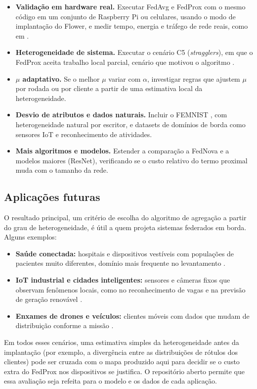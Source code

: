 \begin{itemize}[leftmargin=*, itemsep=2pt]
    \item \textbf{Validação em hardware real.} Executar FedAvg e FedProx com o mesmo código em um conjunto de Raspberry Pi ou celulares, usando o modo de implantação do Flower, e medir tempo, energia e tráfego de rede reais, como em \citet{carranco2025adhoc}.
    \item \textbf{Heterogeneidade de sistema.} Executar o cenário C5 (\textit{stragglers}), em que o FedProx aceita trabalho local parcial, cenário que motivou o algoritmo \citep{li2020fedprox}.
    \item \textbf{$\mu$ adaptativo.} Se o melhor $\mu$ variar com $\alpha$, investigar regras que ajustem $\mu$ por rodada ou por cliente a partir de uma estimativa local da heterogeneidade.
    \item \textbf{Desvio de atributos e dados naturais.} Incluir o FEMNIST \citep{caldas2018leaf}, com heterogeneidade natural por escritor, e datasets de domínios de borda como sensores IoT e reconhecimento de atividades.
    \item \textbf{Mais algoritmos e modelos.} Estender a comparação a FedNova \citep{wang2020fednova} e a modelos maiores (ResNet), verificando se o custo relativo do termo proximal muda com o tamanho da rede.
\end{itemize}

\subsection{Aplicações futuras}

O resultado principal, um critério de escolha do algoritmo de agregação a partir do grau de heterogeneidade, é útil a quem projeta sistemas federados em borda. Alguns exemplos:

\begin{itemize}[leftmargin=*, itemsep=2pt]
    \item \textbf{Saúde conectada:} hospitais e dispositivos vestíveis com populações de pacientes muito diferentes, domínio mais frequente no levantamento \citep{mahmood2025alzheimer, mim2025healthcare}.
    \item \textbf{IoT industrial e cidades inteligentes:} sensores e câmeras fixos que observam fenômenos locais, como no reconhecimento de vagas \citep{bakr2026parkfl} e na previsão de geração renovável \citep{ghosh2026renewable}.
    \item \textbf{Enxames de drones e veículos:} clientes móveis com dados que mudam de distribuição conforme a missão \citep{hu2025uav}.
\end{itemize}

Em todos esses cenários, uma estimativa simples da heterogeneidade antes da implantação (por exemplo, a divergência entre as distribuições de rótulos dos clientes) pode ser cruzada com o mapa produzido aqui para decidir se o custo extra do FedProx nos dispositivos se justifica. O repositório aberto permite que essa avaliação seja refeita para o modelo e os dados de cada aplicação.
